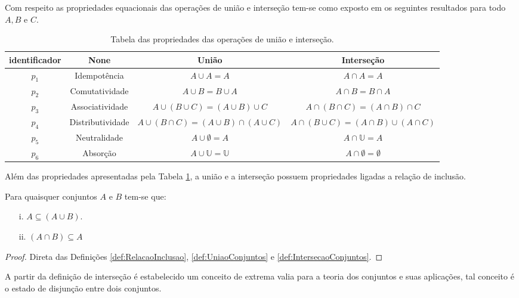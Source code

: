 Com respeito as propriedades equacionais das operações de união e interseção tem-se como exposto em \cite{lipschutz2013-MD} os seguintes resultados para todo $A, B$ e $C$.

\begin{table}[h]
	\centering
	\scriptsize
	\begin{tabular}{cccc}
		\hline
		identificador & None & União & Interseção  \\
		\hline
		$p_1$ & Idempotência &  $A \cup A = A$ & $A \cap A = A$  \\
		$p_2$ & Comutatividade & $A \cup B = B \cup A$ & $A \cap B = B \cap A$ \\
		$p_3$ & Associatividade & $A \cup (B \cup C) = (A \cup B) \cup C$ & $A \cap (B \cap C) = (A \cap B) \cap C$ \\
		$p_4$ & Distributividade & $A \cup (B \cap C) = (A \cup B) \cap (A \cup C)$ & $A \cap (B \cup C) = (A \cap B) \cup (A \cap C)$\\
		$p_5$ & Neutralidade &  $A \cup \emptyset = A$ & $A \cap \mathbb{U} = A$ \\
		$p_6$ & Absorção & $A \cup \mathbb{U} = \mathbb{U}$ & $A \cap \emptyset = \emptyset$ \\
		\hline
	\end{tabular}
	\caption{Tabela das propriedades das operações de união e interseção.}
	\label{tab:PropriedadesUniaoIntersecao}
\end{table}

Além das propriedades apresentadas pela Tabela \ref{tab:PropriedadesUniaoIntersecao}, a união e a interseção possuem propriedades ligadas a relação de inclusão.

\begin{theorem}\label{teo:MonotonicidadeDaUniaoIntersecao}
	Para quaisquer conjuntos $A$ e $B$ tem-se que:
	\begin{itemize}
		\item[i.] $A \subseteq (A \cup B)$.
		\item[ii.] $(A \cap B) \subseteq A$
	\end{itemize}
\end{theorem}

\begin{proof}
	Direta das Definições \ref{def:RelacaoInclusao}, \ref{def:UniaoConjuntos} e \ref{def:IntersecaoConjuntos}.
\end{proof}

A partir da definição de interseção é estabelecido um conceito de extrema valia para a teoria dos conjuntos e suas aplicações, tal conceito é o estado de disjunção entre dois conjuntos.

